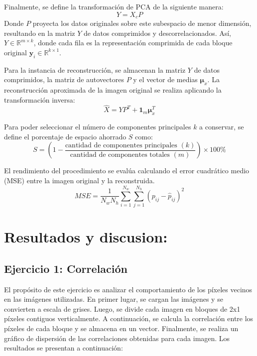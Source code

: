 \documentclass[a4paper,12pt]{article}
\begin{document}
Finalmente, se define la transformación de PCA de la siguiente manera:
\begin{equation}
Y = X_c P
\label{eq:pca}
\end{equation}
Donde $P$ proyecta los datos originales sobre este subespacio de menor dimensión, resultando en la matriz $Y$ de datos comprimidos y descorrelacionados. Así, $Y \in \mathbb{R}^{m \times k}$, donde cada fila es la representación comprimida de cada bloque original $\mathbf{y}_i \in \mathbb{R}^{k \times 1}$.

Para la instancia de reconstrucción, se almacenan la matriz $Y$ de datos comprimidos, la matriz de autovectores $P$ y el vector de medias $\boldsymbol{\mu}_x$. La reconstrucción aproximada de la imagen original se realiza aplicando la transformación inversa:
\begin{equation}
\hat{X} = Y P^T + \mathbf{1}_m \boldsymbol{\mu}_x^T
\label{eq:reconstruccion}
\end{equation}

Para poder seleccionar el número de componentes principales $k$ a conservar, se define el porcentaje de espacio ahorrado $S$ como:
\begin{equation}
S = \left( 1 - \frac{\text{cantidad de componentes principales } (k)}{\text{cantidad de componentes totales } (m)} \right) \times 100 \%
\label{eq:espacio}
\end{equation}

El rendimiento del procedimiento se evalúa calculando el error cuadrático medio (MSE) entre la imagen original y la reconstruida. 
\begin{equation}
MSE = \frac{1}{N_w N_h} \sum_{i=1}^{N_w} \sum_{j=1}^{N_h} (p_{ij} - \hat{p}_{ij})^2
\label{eq:mse}
\end{equation}

\newpage

\section{Resultados y discusion:}
\subsection*{Ejercicio 1: Correlación}
El propósito de este ejercicio es analizar el comportamiento de los píxeles vecinos en las imágenes utilizadas. En primer lugar, se cargan las imágenes y se convierten a escala de grises. Luego, se divide cada imagen en bloques de 2x1 píxeles contiguos verticalmente. A continuación, se calcula la correlación entre los píxeles de cada bloque y se almacena en un vector. Finalmente, se realiza un gráfico de dispersión de las correlaciones obtenidas para cada imagen. Los resultados se presentan a continuación:
\end{document}
